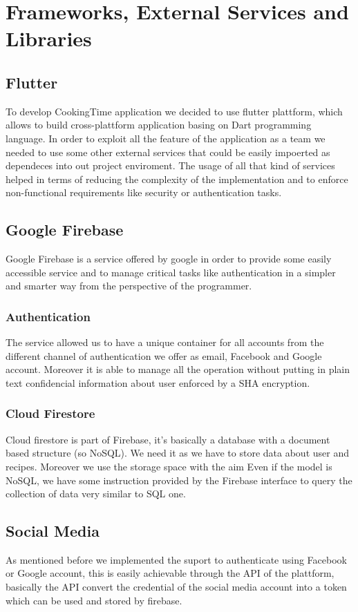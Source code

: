 \chapter{Frameworks, External Services and Libraries}

\section{Flutter}
To develop CookingTime application we decided to use flutter plattform, which allows to build cross-plattform application basing on Dart programming language. 
In order to exploit all the feature of the application as a team we needed to use some other external services that could be easily impoerted as dependeces into out project enviroment. 
The usage of all that kind of services helped in terms of reducing the complexity of the implementation and to enforce non-functional requirements like security or authentication tasks.

\section{Google Firebase}
Google Firebase is a service offered by google in order to provide some easily accessible service and to manage critical tasks like authentication in a simpler and smarter way from the perspective of the programmer.
\subsection{Authentication}
The service allowed us to have a unique container for all accounts from the different channel of authentication we offer as email, Facebook and Google account. 
Moreover it is able to manage all the operation without putting in plain text confidencial information about user enforced by a SHA encryption. %

\subsection{Cloud Firestore}
Cloud firestore is part of Firebase, it's basically a database with a document based structure (so NoSQL). We need it as we have to store data about user and recipes.
Moreover we use the storage space with the aim  
Even if the model is NoSQL, we have some instruction provided by the Firebase interface to query the collection of data very similar to SQL one.

\section{Social Media}
As mentioned before we implemented the suport to authenticate using Facebook or Google account, this is easily achievable through the API of the plattform, basically the API convert the credential of the social media account into a token which can be used and stored by firebase.
